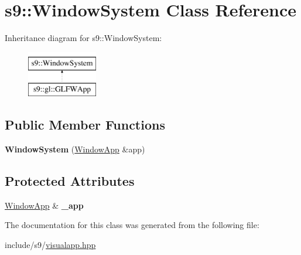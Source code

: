\hypertarget{classs9_1_1WindowSystem}{\section{s9\-:\-:Window\-System Class Reference}
\label{classs9_1_1WindowSystem}
}
Inheritance diagram for s9\-:\-:Window\-System\-:\begin{figure}[H]
\begin{center}
\leavevmode
\includegraphics[height=2.000000cm]{classs9_1_1WindowSystem}
\end{center}
\end{figure}
\subsection*{Public Member Functions}
\begin{DoxyCompactItemize}
\item 
\hypertarget{classs9_1_1WindowSystem_a0b0cdd9409f154bbafc02f28d4e13805}{{\bfseries Window\-System} (\hyperlink{classs9_1_1WindowApp}{Window\-App} \&app)}\label{classs9_1_1WindowSystem_a0b0cdd9409f154bbafc02f28d4e13805}

\end{DoxyCompactItemize}
\subsection*{Protected Attributes}
\begin{DoxyCompactItemize}
\item 
\hypertarget{classs9_1_1WindowSystem_afb0943288d3d6fb6f53e580fc7bb6918}{\hyperlink{classs9_1_1WindowApp}{Window\-App} \& {\bfseries \-\_\-app}}\label{classs9_1_1WindowSystem_afb0943288d3d6fb6f53e580fc7bb6918}

\end{DoxyCompactItemize}


The documentation for this class was generated from the following file\-:\begin{DoxyCompactItemize}
\item 
include/s9/\hyperlink{visualapp_8hpp}{visualapp.\-hpp}\end{DoxyCompactItemize}
